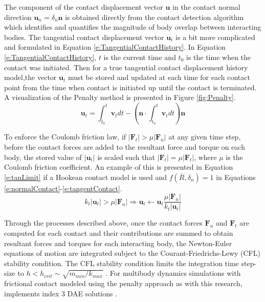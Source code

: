 \documentclass[12pt,onecolumn]{report}
\newcommand{\CHRONO}{{\sffamily{{Chrono}}}}
\begin{document}
The component of the contact displacement vector $\boldsymbol{u}$ in the contact normal direction $\boldsymbol{u}_n = \delta_n \boldsymbol{n}$ is obtained directly from the contact detection algorithm which identifies and quantifies the magnitude of body overlap between interacting bodies. The tangential contact displacement vector $\boldsymbol{u}_t$ is a bit more complicated and formulated in Equation \ref{e:TangentialContactHistory}. In Equation \ref{e:TangentialContactHistory}, $t$ is the current time and $t_0$ is the time when the contact was initiated. Then for a true tangential contact displacement history model,the vector $\boldsymbol{u}_t$ must be stored and updated at each time for each contact point from the time when contact is initiated up until the contact is terminated. A visualization of the Penalty method is presented in Figure \ref{fig:Penalty}. 
%
\begin{equation}\label{e:TangentialContactHistory}
\boldsymbol{u}_t = \int_{t_0}^{t}\boldsymbol{v}_t dt - \left( \boldsymbol{n}\cdot  \int_{t_0}^{t}\boldsymbol{v}_t dt \right)  \boldsymbol{n}
\end{equation}

To enforce the Coulomb friction law, if $\lvert \boldsymbol{F}_t \rvert > \mu\lvert \boldsymbol{F}_n \rvert$ at any given time step, before the contact forces are added to the resultant force and torque on each body, the stored value of $\lvert\boldsymbol{u}_t\rvert$ is scaled such that $\lvert \boldsymbol{F}_t \rvert = \mu\lvert \boldsymbol{F}_t \rvert$, where $\mu$ is the Coulomb friction coefficient. An example of this is presented in Equation \ref{e:tanLimit} if a Hookean contact model is used and $ f\left(\bar{R},\delta_n\right) = 1$ in Equations \ref{e:normalContact}-\ref{e:tangentContact}.
%
\begin{equation}\label{e:tanLimit}
k_t\lvert \boldsymbol{u}_t \rvert > \mu\lvert \boldsymbol{F}_n \rvert  \Rightarrow \boldsymbol{u}_t \leftarrow \boldsymbol{u}_t \frac{\mu\lvert \boldsymbol{F}_n \rvert}{k_t\lvert \boldsymbol{u}_t \rvert}
\end{equation}

Through the processes described above, once the contact forces $\boldsymbol{F}_n$ and $\boldsymbol{F}_t$ are computed for each contact and their contributions are summed to obtain resultant forces and torques for each interacting body, the Newton-Euler equations of motion are integrated subject to the Courant-Friedrichs-Lewy (CFL) stability condition. The CFL stability condition limits the integration time step-size to $h<h_{crit} \sim \sqrt{m_{min} / k_{max}}$  \cite{OSullivan&Bray2004}. For multibody dynamics simulations with frictional contact modeled using the penalty approach as with this research, {\CHRONO} implements index 3 DAE solutions \cite{Chrono2016}.
\end{document}
